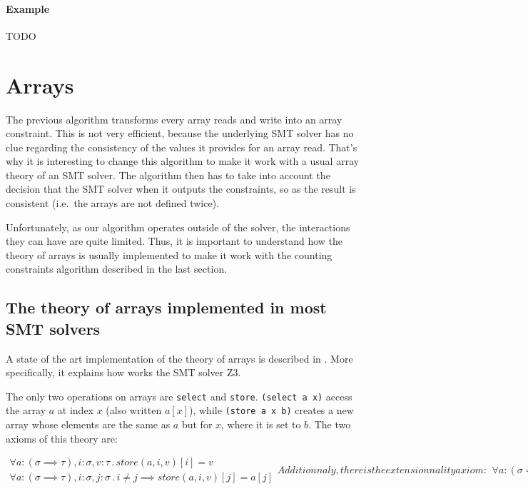 \documentclass[]{article}
\begin{document}
\paragraph{Example}\label{example-1}

TODO

\section{Arrays}\label{arrays}

The previous algorithm transforms every array reads and write into an
array constraint. This is not very efficient, because the underlying SMT
solver has no clue regarding the consistency of the values it provides
for an array read. That's why it is interesting to change this algorithm
to make it work with a usual array theory of an SMT solver. The
algorithm then has to take into account the decision that the SMT solver
when it outputs the constraints, so as the result is consistent
(i.e.~the arrays are not defined twice).

Unfortunately, as our algorithm operates outside of the solver, the
interactions they can have are quite limited. Thus, it is important to
understand how the theory of arrays is usually implemented to make it
work with the counting constraints algorithm described in the last
section.

\subsection{The theory of arrays implemented in most SMT
solvers}\label{the-theory-of-arrays-implemented-in-most-smt-solvers}

A state of the art implementation of the theory of arrays is described
in \cite{de2009generalized}. More specifically, it
explains how works the SMT solver Z3.

The only two operations on arrays are \texttt{select} and
\texttt{store}. \texttt{(select\ a\ x)} access the array $a$ at index
$x$ (also written $a[x]$), while \texttt{(store\ a\ x\ b)} creates a
new array whose elements are the same as $a$ but for $x$, where it
is set to $b$. The two axioms of this theory are:

\begin{subequations}
    \begin{align}
        \forall a:(\sigma \implies \tau), i:\sigma, v:\tau\, .\, store(a, i, v)[i] = v
        \\
        \forall a:(\sigma \implies \tau), i:\sigma, j:\sigma\, .\, i \neq j \implies store(a, i, v)[j] = a[j]
    \end{align}


    Additionnaly, there is the extensionnality axiom:

    \begin{align}
        \forall a:(\sigma \implies \tau), b:(\sigma \implies \tau)\, .\, a \neq b \iff \exists i\: a[i] \implies a[i] \neq b[i]
    \end{align}
\end{subequations}
\end{document}
